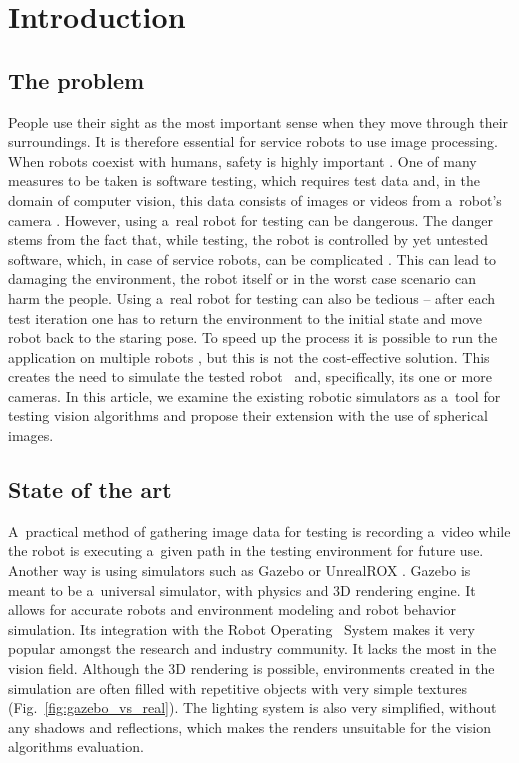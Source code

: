 \documentclass{svproc}
\begin{document}
\section{Introduction}

\subsection{The problem}

People use their sight as the most important sense when they move through their surroundings.
It is therefore essential for service robots to use image processing.
When robots coexist with humans, safety is highly important \cite{haddadin2007safety}.
One of many measures to be taken is software testing,
which requires test data and, in the domain of computer vision, this data consists of images or videos from a~robot's camera \cite{7759425}.
However, using a~real robot for testing can be dangerous.
The danger stems from the fact that, while testing, the robot is controlled by yet untested software, which, in case of service robots, can be complicated \cite{Dudek-multitasking-romoco-2019-twiki}. This can lead to damaging the environment, the robot itself or in the worst case scenario can harm the people.
Using a~real robot for testing can also be tedious -- after each test iteration one has to return the environment to the initial state and move robot back to the staring pose.
To speed up the process it is possible to run the application on multiple robots \cite{levine2018learning}, but this is not the cost-effective solution.
This creates the need to simulate the tested robot~\cite{seredynski2016graph} and, specifically, its one or more cameras. 
In this article, we examine the existing robotic simulators as a~tool for testing vision algorithms and propose
their extension with the use of spherical images.

\subsection{State of the art}

A~practical method of gathering image data for testing is recording a~video while the robot is executing a~given path in the testing environment for future use.
Another way is using simulators such as Gazebo \cite{koenig2004design} or UnrealROX \cite{martinez2019unrealrox}.
Gazebo is meant to be a~universal simulator, with physics and 3D rendering engine. It allows for accurate 
robots and environment modeling and robot behavior simulation. Its integration with the Robot Operating \
System makes it very popular amongst the research and industry community. It lacks the most in the vision 
field. Although the 3D rendering is possible, environments created in the simulation are often filled
with repetitive objects with very simple textures (Fig.~\ref{fig:gazebo_vs_real}).
 The lighting system is also very simplified, without any 
shadows and reflections, which makes the renders unsuitable for the vision algorithms evaluation. 
\end{document}
